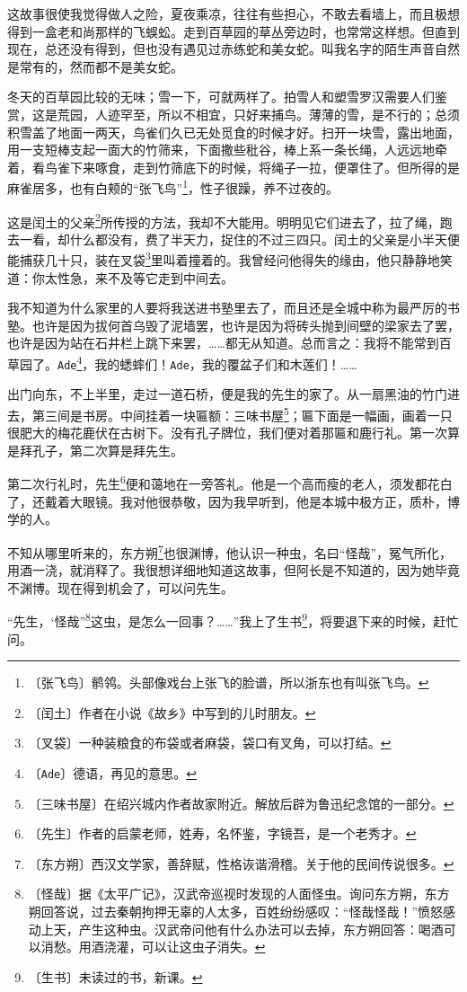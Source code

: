 \documentclass[12pt,UTF-8,openany]{ctexbook}
\begin{document}
\begin{normalsize}
    这故事很使我觉得做人之险，夏夜乘凉，往往有些担心，不敢去看墙上，而且极想得到一盒老和尚那样的飞蜈蚣。走到百草园的草丛旁边时，也常常这样想。但直到现在，总还没有得到，但也没有遇见过赤练蛇和美女蛇。叫我名字的陌生声音自然是常有的，然而都不是美女蛇。
    
    冬天的百草园比较的无味；雪一下，可就两样了。拍雪人和塑雪罗汉需要人们鉴赏，这是荒园，人迹罕至，所以不相宜，只好来捕鸟。薄薄的雪，是不行的；总须积雪盖了地面一两天，鸟雀们久已无处觅食的时候才好。扫开一块雪，露出地面，用一支短棒支起一面大的竹筛来，下面撒些秕谷，棒上系一条长绳，人远远地牵着，看鸟雀下来啄食，走到竹筛底下的时候，将绳子一拉，便罩住了。但所得的是麻雀居多，也有白颊的“张飞鸟”\footnote{〔张飞鸟〕鹡鸰。头部像戏台上张飞的脸谱，所以浙东也有叫张飞鸟。}，性子很躁，养不过夜的。
    
    这是闰土的父亲\footnote{〔闰土〕作者在小说《故乡》中写到的儿时朋友。}所传授的方法，我却不大能用。明明见它们进去了，拉了绳，跑去一看，却什么都没有，费了半天力，捉住的不过三四只。闰土的父亲是小半天便能捕获几十只，装在叉袋\footnote{〔叉袋〕一种装粮食的布袋或者麻袋，袋口有叉角，可以打结。}里叫着撞着的。我曾经问他得失的缘由，他只静静地笑道：你太性急，来不及等它走到中间去。
    
    我不知道为什么家里的人要将我送进书塾里去了，而且还是全城中称为最严厉的书塾。也许是因为拔何首乌毁了泥墙罢，也许是因为将砖头抛到间壁的梁家去了罢，也许是因为站在石井栏上跳下来罢，……都无从知道。总而言之：我将不能常到百草园了。\texttt{Ade}\footnote{〔\texttt{Ade}〕德语，再见的意思。}，我的蟋蟀们！\texttt{Ade}，我的覆盆子们和木莲们！……
    
    出门向东，不上半里，走过一道石桥，便是我的先生的家了。从一扇黑油的竹门进去，第三间是书房。中间挂着一块匾额：三味书屋\footnote{〔三味书屋〕在绍兴城内作者故家附近。解放后辟为鲁迅纪念馆的一部分。}；匾下面是一幅画，画着一只很肥大的梅花鹿伏在古树下。没有孔子牌位，我们便对着那匾和鹿行礼。第一次算是拜孔子，第二次算是拜先生。
    
    第二次行礼时，先生\footnote{〔先生〕作者的启蒙老师，姓寿，名怀鉴，字镜吾，是一个老秀才。}便和蔼地在一旁答礼。他是一个高而瘦的老人，须发都花白了，还戴着大眼镜。我对他很恭敬，因为我早听到，他是本城中极方正，质朴，博学的人。
    
    不知从哪里听来的，东方朔\footnote{〔东方朔〕西汉文学家，善辞赋，性格诙谐滑稽。关于他的民间传说很多。}也很渊博，他认识一种虫，名曰“怪哉”，冤气所化，用酒一浇，就消释了。我很想详细地知道这故事，但阿长是不知道的，因为她毕竟不渊博。现在得到机会了，可以问先生。
    
    “先生，‘怪哉”\footnote{〔怪哉〕据《太平广记》，汉武帝巡视时发现的人面怪虫。询问东方朔，东方朔回答说，过去秦朝拘押无辜的人太多，百姓纷纷感叹：“怪哉怪哉！”愤怒感动上天，产生这种虫。汉武帝问他有什么办法可以去掉，东方朔回答：喝酒可以消愁。用酒浇灌，可以让这虫子消失。}这虫，是怎么一回事？……”我上了生书\footnote{〔生书〕未读过的书，新课。}，将要退下来的时候，赶忙问。
    

\end{normalsize}
\end{document}

